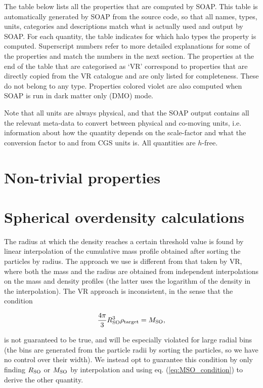 \documentclass{article}
\begin{document}
The table below lists all the properties that are computed by SOAP. This table is automatically generated by 
SOAP from the source code, so that all names, types, units, categories and descriptions match what is actually 
used and output by SOAP. For each quantity, the table indicates for which halo types the property is computed. 
Superscript numbers refer to more detailed explanations for some of the properties and match the numbers in 
the next section. The properties at the end of the table that are categorised as `VR' correspond to properties 
that are directly copied from the VR catalogue and are only listed for completeness. These do not belong to 
any type. Properties colored violet are also computed when SOAP is run in dark matter only (DMO) mode.

Note that all units are always physical, and that the SOAP output contains all the relevant meta-data to 
convert between physical and co-moving units, i.e. information about how the quantity depends on the 
scale-factor and what the conversion factor to and from CGS units is. All quantities are $h$-free.



\section{Non-trivial properties}



\section{Spherical overdensity calculations}

The radius at which the density reaches a certain threshold value is found by linear interpolation of the 
cumulative mass profile obtained after sorting the particles by radius. The approach we use is different from 
that taken by VR, where both the mass and the radius are obtained from independent interpolations on the mass 
and density profiles (the latter uses the logarithm of the density in the interpolation). The VR approach is 
inconsistent, in the sense that the condition

\begin{equation}
    \frac{4\pi{}}{3} R_{\rm{}SO}^3 \rho{}_{\rm{}target} = M_{\rm{}SO},\label{eq:MSO_condition}
\end{equation}

is not guaranteed to be true, and will be especially violated for large radial bins (the bins are generated 
from the particle radii by sorting the particles, so we have no control over their width). We instead opt to 
guarantee this condition by only finding $R_{\rm{}SO}$ or $M_{\rm{}SO}$ by interpolation and using eq. 
(\ref{eq:MSO_condition}) to derive the other quantity.
\end{document}
